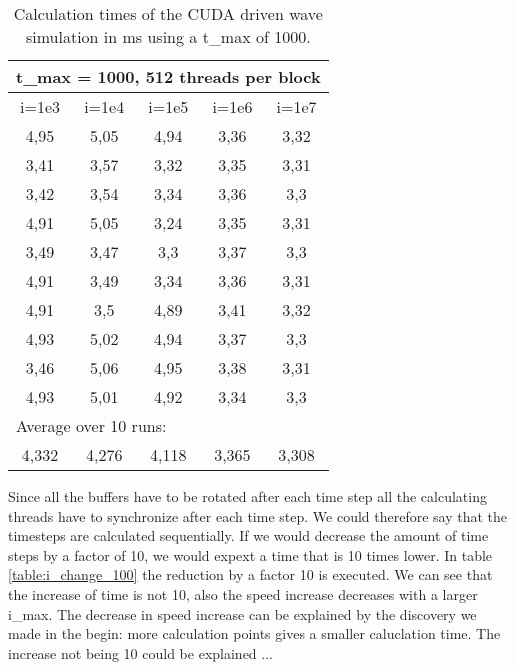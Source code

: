 \documentclass[a4paper]{article}
\begin{document}
		\begin{table}[H]
			\label{table:i_change_1000}
			\caption{Calculation times of the CUDA driven wave simulation in ms using a t\_max of 1000.}
			\begin{center}
				\begin{tabular}{| c | c | c | c | c |}
					\hline
					\multicolumn{5}{|l|}{t\_max = 1000, 512 threads per block}\\
					\hline
					i=1e3 & i=1e4 & i=1e5 & i=1e6 & i=1e7\\ 
					\hline
					4,95 & 5,05 & 4,94 & 3,36 & 3,32\\ 
					\hline
					3,41 & 3,57 & 3,32 & 3,35 & 3,31\\ 
					\hline
					3,42 & 3,54 & 3,34 & 3,36 & 3,3\\ 
					\hline
					4,91 & 5,05 & 3,24 & 3,35 & 3,31\\ 
					\hline
					3,49 & 3,47 & 3,3 & 3,37 & 3,3\\ 
					\hline
					4,91 & 3,49 & 3,34 & 3,36 & 3,31\\ 
					\hline
					4,91 & 3,5 & 4,89 & 3,41 & 3,32\\ 
					\hline
					4,93 & 5,02 & 4,94 & 3,37 & 3,3\\ 
					\hline
					3,46 & 5,06 & 4,95 & 3,38 & 3,31\\ 
					\hline
					4,93 & 5,01 & 4,92 & 3,34 & 3,3\\ 
					\hline
					\multicolumn{5}{|l|}{Average over 10 runs:}\\
					\hline
					4,332 & 4,276 & 4,118 & 3,365 & 3,308\\ 
					\hline
				\end{tabular}
			\end{center}
		\end{table}
		
		Since all the buffers have to be rotated after each time step all the calculating threads have to synchronize after each time step.
		We could therefore say that the timesteps are calculated sequentially.
		If we would decrease the amount of time steps by a factor of 10, we would expext a time that is 10 times lower.
		In table \ref{table:i_change_100} the reduction by a factor 10 is executed.
		We can see that the increase of time is not 10, also the speed increase decreases with a larger i\_max.
		The decrease in speed increase can be explained by the discovery we made in the begin: more calculation points gives a smaller caluclation time.
		The increase not being 10 could be explained ...
		
\end{document}
